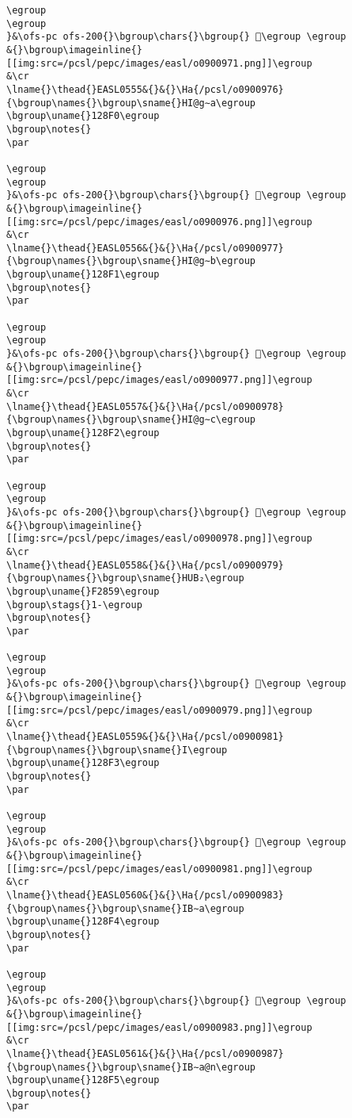 \begin{verbatim}
\egroup
\egroup
}&\ofs-pc ofs-200{}\bgroup\chars{}\bgroup{} 𒣯\egroup \egroup
&{}\bgroup\imageinline{}[[img:src=/pcsl/pepc/images/easl/o0900971.png]]\egroup
&\cr
\lname{}\thead{}EASL0555&{}&{}\Ha{/pcsl/o0900976}{\bgroup\names{}\bgroup\sname{}HI@g∼a\egroup
\bgroup\uname{}128F0\egroup
\bgroup\notes{}
\par 

\egroup
\egroup
}&\ofs-pc ofs-200{}\bgroup\chars{}\bgroup{} 𒣰\egroup \egroup
&{}\bgroup\imageinline{}[[img:src=/pcsl/pepc/images/easl/o0900976.png]]\egroup
&\cr
\lname{}\thead{}EASL0556&{}&{}\Ha{/pcsl/o0900977}{\bgroup\names{}\bgroup\sname{}HI@g∼b\egroup
\bgroup\uname{}128F1\egroup
\bgroup\notes{}
\par 

\egroup
\egroup
}&\ofs-pc ofs-200{}\bgroup\chars{}\bgroup{} 𒣱\egroup \egroup
&{}\bgroup\imageinline{}[[img:src=/pcsl/pepc/images/easl/o0900977.png]]\egroup
&\cr
\lname{}\thead{}EASL0557&{}&{}\Ha{/pcsl/o0900978}{\bgroup\names{}\bgroup\sname{}HI@g∼c\egroup
\bgroup\uname{}128F2\egroup
\bgroup\notes{}
\par 

\egroup
\egroup
}&\ofs-pc ofs-200{}\bgroup\chars{}\bgroup{} 𒣲\egroup \egroup
&{}\bgroup\imageinline{}[[img:src=/pcsl/pepc/images/easl/o0900978.png]]\egroup
&\cr
\lname{}\thead{}EASL0558&{}&{}\Ha{/pcsl/o0900979}{\bgroup\names{}\bgroup\sname{}HUB₂\egroup
\bgroup\uname{}F2859\egroup
\bgroup\stags{}1-\egroup
\bgroup\notes{}
\par 

\egroup
\egroup
}&\ofs-pc ofs-200{}\bgroup\chars{}\bgroup{} 󲡙\egroup \egroup
&{}\bgroup\imageinline{}[[img:src=/pcsl/pepc/images/easl/o0900979.png]]\egroup
&\cr
\lname{}\thead{}EASL0559&{}&{}\Ha{/pcsl/o0900981}{\bgroup\names{}\bgroup\sname{}I\egroup
\bgroup\uname{}128F3\egroup
\bgroup\notes{}
\par 

\egroup
\egroup
}&\ofs-pc ofs-200{}\bgroup\chars{}\bgroup{} 𒣳\egroup \egroup
&{}\bgroup\imageinline{}[[img:src=/pcsl/pepc/images/easl/o0900981.png]]\egroup
&\cr
\lname{}\thead{}EASL0560&{}&{}\Ha{/pcsl/o0900983}{\bgroup\names{}\bgroup\sname{}IB∼a\egroup
\bgroup\uname{}128F4\egroup
\bgroup\notes{}
\par 

\egroup
\egroup
}&\ofs-pc ofs-200{}\bgroup\chars{}\bgroup{} 𒣴\egroup \egroup
&{}\bgroup\imageinline{}[[img:src=/pcsl/pepc/images/easl/o0900983.png]]\egroup
&\cr
\lname{}\thead{}EASL0561&{}&{}\Ha{/pcsl/o0900987}{\bgroup\names{}\bgroup\sname{}IB∼a@n\egroup
\bgroup\uname{}128F5\egroup
\bgroup\notes{}
\par 


\end{verbatim}
